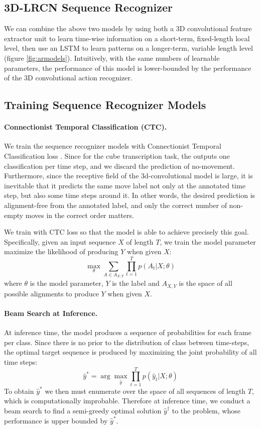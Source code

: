 \documentclass[10pt,twocolumn,letterpaper]{article}
\begin{document}
\subsection{3D-LRCN Sequence Recognizer}

We can combine the above two models by using both a 3D convolutional feature extractor unit to learn time-wise information on a short-term, fixed-length local level, then use an LSTM to learn patterns on a longer-term, variable length level (figure \ref{fig:armodels}). Intuitively, with the same numbers of learnable parameters, the performance of this model is lower-bounded by the performance of the 3D convolutional action recognizer.

\subsection{Training Sequence Recognizer Models} 
\paragraph{Connectionist Temporal Classification (CTC).}

We train the sequence recognizer models with Connectionist Temporal Classification loss \cite{ctc}. Since for the cube transcription task, the outputs one classification per time step, and we discard the prediction of no-movement. Furthermore, since the receptive field of the 3d-convolutional model is large, it is inevitable that it predicts the same move label not only at the annotated time step, but also some time steps around it. In other words, the desired prediction is alignment-free from the annotated label, and only the correct number of non-empty moves in the correct order matters. 

We train with CTC loss so that the model is able to achieve precisely this goal. Specifically, given an input sequence $X$ of length $T$, we train the model parameter maximize the likelihood of producing $Y$ when given $X$:
\[
    \max_{\theta} \sum_{A \in A_{X,Y}} \prod_{t=1}^T p(A_t | X ; \theta)
\]
where $\theta$ is the model parameter, $Y$ is the label and $A_{X,Y}$ is the space of all possible alignments to produce $Y$ when given $X$. 

\paragraph{Beam Search at Inference.}

At inference time, the model produces a sequence of probabilities for each frame per class. Since there is no prior to the distribution of class between time-steps, the optimal target sequence is produced by maximizing the joint probability of all time steps:
\[
    \hat y^*  = \arg \max_{\hat y }  \prod_{t=1}^T p(\hat y_t | X; \theta)
\]
To obtain $\hat y^*$ we then must enumerate over the space of all sequences of length $T$, which is computationally improbable. Therefore at inference time, we conduct a beam search to find a semi-greedy optimal solution $\hat y^\dagger$ to the problem, whose performance is upper bounded by $\hat y^*$.  
\end{document}
